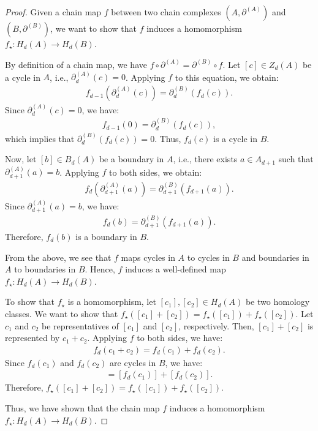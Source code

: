 \begin{proof}
Given a chain map \( f \) between two chain complexes \( (A, \partial^{(A)}) \) and \( (B, \partial^{(B)}) \), we want to show that \( f \) induces a homomorphism \( f_{\star}: H_{d}(A) \rightarrow H_{d}(B) \).

By definition of a chain map, we have \( f \circ \partial^{(A)} = \partial^{(B)} \circ f \). Let \([c] \in Z_{d}(A)\) be a cycle in \( A \), i.e., \( \partial^{(A)}_{d}(c) = 0 \). Applying \( f \) to this equation, we obtain:
\begin{align}
f_{d-1}(\partial^{(A)}_{d}(c)) = \partial^{(B)}_{d}(f_{d}(c)).
\end{align}
Since \( \partial^{(A)}_{d}(c) = 0 \), we have:
\begin{align}
f_{d-1}(0) = \partial^{(B)}_{d}(f_{d}(c)),
\end{align}
which implies that \( \partial^{(B)}_{d}(f_{d}(c)) = 0 \). Thus, \( f_{d}(c) \) is a cycle in \( B \).

Now, let \([b] \in B_{d}(A) \) be a boundary in \( A \), i.e., there exists \( a \in A_{d+1} \) such that \( \partial^{(A)}_{d+1}(a) = b \). Applying \( f \) to both sides, we obtain:
\begin{align}
f_{d}(\partial^{(A)}_{d+1}(a)) = \partial^{(B)}_{d+1}(f_{d+1}(a)).
\end{align}
Since \( \partial^{(A)}_{d+1}(a) = b \), we have:
\begin{align}
f_{d}(b) = \partial^{(B)}_{d+1}(f_{d+1}(a)).
\end{align}
Therefore, \( f_{d}(b) \) is a boundary in \( B \).

From the above, we see that \( f \) maps cycles in \( A \) to cycles in \( B \) and boundaries in \( A \) to boundaries in \( B \). Hence, \( f \) induces a well-defined map \( f_{\star}: H_{d}(A) \rightarrow H_{d}(B) \).

To show that \( f_{\star} \) is a homomorphism, let \([c_{1}], [c_{2}] \in H_{d}(A) \) be two homology classes. We want to show that \( f_{\star}([c_{1}] + [c_{2}]) = f_{\star}([c_{1}]) + f_{\star}([c_{2}]) \). Let \( c_{1} \) and \( c_{2} \) be representatives of \([c_{1}]\) and \([c_{2}]\), respectively. Then, \([c_{1}] + [c_{2}]\) is represented by \( c_{1} + c_{2} \). Applying \( f \) to both sides, we have:
\begin{align}
f_{d}(c_{1} + c_{2}) = f_{d}(c_{1}) + f_{d}(c_{2}).
\end{align}
Since \( f_{d}(c_{1}) \) and \( f_{d}(c_{2}) \) are cycles in \( B \), we have:
\begin{align}
[f_{d}(c_{1} + c_{2})] = [f_{d}(c_{1})] + [f_{d}(c_{2})].
\end{align}
Therefore, \( f_{\star}([c_{1}] + [c_{2}]) = f_{\star}([c_{1}]) + f_{\star}([c_{2}]) \).

Thus, we have shown that the chain map \( f \) induces a homomorphism \( f_{\star}: H_{d}(A) \rightarrow H_{d}(B) \).
\end{proof}

